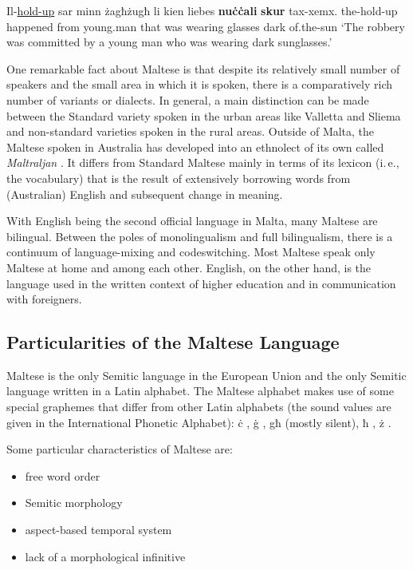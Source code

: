 \begin{multicols}{2}
\begin{examples}
\item
\gll Il-\underline{hold-up} sar minn żagħżugħ li kien liebes \textbf{nuċċali} \textbf{skur} tax-xemx.
the-hold-up happened from young.man that was wearing glasses dark of.the-sun
\glt `The robbery was committed by a young man who was wearing dark sunglasses.'
\glend
\end{examples}

One remarkable fact about Maltese is that despite its relatively small number of speakers and the small area in which it is spoken, there is a comparatively rich number of variants or dialects. In general, a main distinction can be made between the Standard variety spoken in the urban areas like Valletta and Sliema and non-standard varieties spoken in the rural areas. Outside of Malta, the Maltese spoken in Australia has developed into an ethnolect of its own called \emph{Maltraljan}  \cite{Bovingdon:2001}. It differs from Standard Maltese mainly in terms of its lexicon (i.\,e., the vocabulary) that is the result of extensively borrowing words from (Australian) English and subsequent change in meaning. 

With English being the second official language in Malta, many Maltese are bilingual. Between the poles of monolingualism and full bilingualism, there is a continuum of language-mixing and codeswitching. Most Maltese speak only Maltese at home and among each other. English, on the other hand, is the language used in the written context of higher education and in communication with foreigners. 

\subsection{Particularities of the Maltese Language}

Maltese is the only Semitic language in the European Union and the only Semitic language written in a Latin alphabet. The Maltese alphabet makes use of some special graphemes that differ from other Latin alphabets (the sound values are given in the International Phonetic Alphabet): ċ , ġ , għ (mostly silent), ħ , ż  \cite{Fabri:2011a,Borg-Alexander:1997}.

Some particular characteristics of Maltese are:

\begin{itemize}
\item free word order 
\item Semitic morphology 
\item aspect-based temporal system
\item lack of a morphological infinitive
\end{itemize}


\end{multicols}
